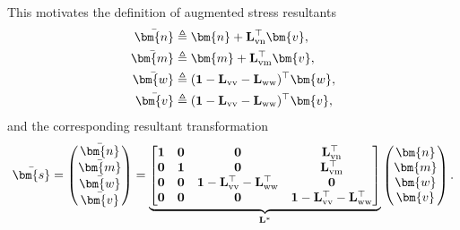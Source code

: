 This motivates the definition of augmented stress resultants
\begin{equation}
  \begin{aligned}
    \bar{\bm{n}} &\triangleq \bm{n} + \mathbf{L}_{\rm vn}^{\top}\bm{v}, \\
    \bar{\bm{m}} &\triangleq \bm{m} + \mathbf{L}_{\rm vm}^{\top}\bm{v}, \\
    \bar{\bm{w}} &\triangleq (\mathbf{1}-\mathbf{L}_{\rm vv}-\mathbf{L}_{\rm ww})^{\top}\bm{w}, \\
    \bar{\bm{v}} &\triangleq (\mathbf{1}-\mathbf{L}_{\rm vv}-\mathbf{L}_{\rm ww})^{\top}\bm{v},
  \end{aligned}
\end{equation}
and the corresponding resultant transformation
\[
  \bar{\bm{s}}
  =
  \begin{pmatrix}
    \bar{\bm{n}} \\ \bar{\bm{m}} \\ \bar{\bm{w}} \\ \bar{\bm{v}}
  \end{pmatrix}
  =
  \underbrace{
  \begin{bmatrix}
    \mathbf{1} & \mathbf{0} & \mathbf{0} & \mathbf{L}_{\rm vn}^{\top} \\
    \mathbf{0} & \mathbf{1} & \mathbf{0} & \mathbf{L}_{\rm vm}^{\top} \\
    \mathbf{0} & \mathbf{0} & \mathbf{1}-\mathbf{L}_{\rm vv}^{\top}-\mathbf{L}_{\rm ww}^{\top} & \mathbf{0} \\
    \mathbf{0} & \mathbf{0} & \mathbf{0} & \mathbf{1}-\mathbf{L}_{\rm vv}^{\top}-\mathbf{L}_{\rm ww}^{\top}
  \end{bmatrix}
  }_{\mathbf{L}^*}
  \begin{pmatrix}
    \bm{n} \\ \bm{m} \\ \bm{w} \\ \bm{v}
  \end{pmatrix}.
\]

